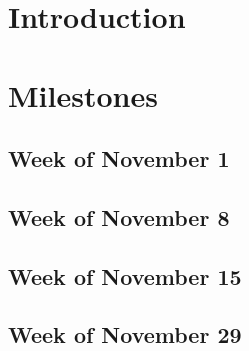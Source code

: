 \documentclass[conf]{new-aiaa}
\begin{document}

\section{Introduction}

\section{Milestones}

    \subsection{Week of November 1}
    
    \subsection{Week of November 8}
    
    \subsection{Week of November 15}
    
    \subsection{Week of November 29}
\end{document}
